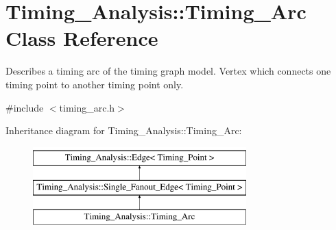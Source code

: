 \hypertarget{classTiming__Analysis_1_1Timing__Arc}{\section{Timing\-\_\-\-Analysis\-:\-:Timing\-\_\-\-Arc Class Reference}
\label{classTiming__Analysis_1_1Timing__Arc}
}


Describes a timing arc of the timing graph model. Vertex which connects one timing point to another timing point only.  




{\ttfamily \#include $<$timing\-\_\-arc.\-h$>$}

Inheritance diagram for Timing\-\_\-\-Analysis\-:\-:Timing\-\_\-\-Arc\-:\begin{figure}[H]
\begin{center}
\leavevmode
\includegraphics[height=3.000000cm]{classTiming__Analysis_1_1Timing__Arc}
\end{center}
\end{figure}
